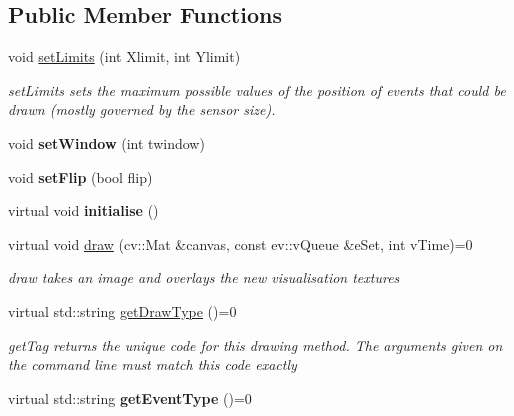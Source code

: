 \subsection*{Public Member Functions}
\begin{DoxyCompactItemize}
\item 
void \hyperlink{classvDraw_a94008d089d3fcc8782b2e175bd0cca59}{set\+Limits} (int Xlimit, int Ylimit)
\begin{DoxyCompactList}\small\item\em set\+Limits sets the maximum possible values of the position of events that could be drawn (mostly governed by the sensor size). \end{DoxyCompactList}\item 
void {\bfseries set\+Window} (int twindow)\hypertarget{classvDraw_a81cc01f4bd16c04124198e72e7bd6d50}{}\label{classvDraw_a81cc01f4bd16c04124198e72e7bd6d50}

\item 
void {\bfseries set\+Flip} (bool flip)\hypertarget{classvDraw_af3f4e8539db44898bb60f8e867f0a3dc}{}\label{classvDraw_af3f4e8539db44898bb60f8e867f0a3dc}

\item 
virtual void {\bfseries initialise} ()\hypertarget{classvDraw_aaea7bac3b19b9004bd60c16d841cfd14}{}\label{classvDraw_aaea7bac3b19b9004bd60c16d841cfd14}

\item 
virtual void \hyperlink{classvDraw_a35cf7b42fe542fd51c1014de19fb114c}{draw} (cv\+::\+Mat \&canvas, const ev\+::v\+Queue \&e\+Set, int v\+Time)=0
\begin{DoxyCompactList}\small\item\em draw takes an image and overlays the new visualisation textures \end{DoxyCompactList}\item 
virtual std\+::string \hyperlink{classvDraw_abb4aa2bb3bb8daca40bdb12cd55d3fd3}{get\+Draw\+Type} ()=0
\begin{DoxyCompactList}\small\item\em get\+Tag returns the unique code for this drawing method. The arguments given on the command line must match this code exactly \end{DoxyCompactList}\item 
virtual std\+::string {\bfseries get\+Event\+Type} ()=0\hypertarget{classvDraw_a9c801e074f399b0e0d9b18cdfd798031}{}\label{classvDraw_a9c801e074f399b0e0d9b18cdfd798031}

\end{DoxyCompactItemize}
